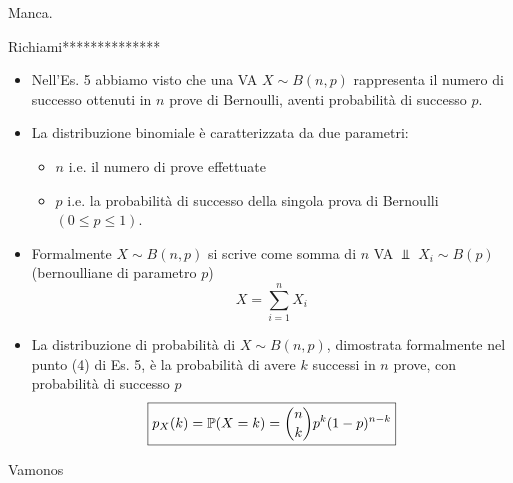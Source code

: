 \Soluzione

Manca.

\Soluzione

Richiami**************
\begin{itemize}
\item Nell'Es. 5 abbiamo visto che una VA $X\sim B(n,p)$ rappresenta il numero di successo ottenuti in $n$ prove di Bernoulli, aventi probabilità di successo $p$.
\item La distribuzione binomiale è caratterizzata da due parametri:
\begin{itemize}
\item $n$ i.e. il numero di prove effettuate
\item $p$ i.e. la probabilità di successo della singola prova di Bernoulli $(0\leq p\leq 1)$.
\end{itemize}
\item Formalmente $X\sim B(n,p)$ si scrive come somma di $n$ VA $\Bot $ $X_{i} \sim B(p)$ (bernoulliane di parametro $p$)
\begin{equation*}
X=\sum\limits_{i=1}^{n} X_{i}
\end{equation*}
\item La distribuzione di probabilità di $X\sim B(n,p)$, dimostrata formalmente nel punto (4) di Es. 5, è la probabilità di avere $k$ successi in $n$ prove, con probabilità di successo $p$
\begin{equation*}
\boxed{p_{X}(k) =\mathbb{P}(X=k) =\binom{n}{k} p^{k}(1-p)^{n-k}}
\end{equation*}
\end{itemize}

Vamonos


